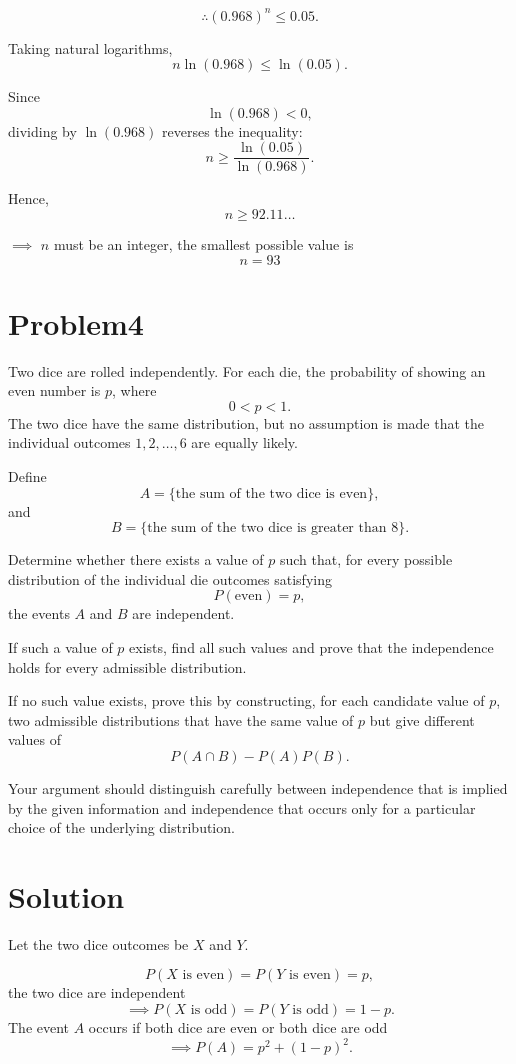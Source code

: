 \documentclass[12pt]{article}
\begin{document}
\[
\therefore
(0.968)^n\leq 0.05.
\]

Taking natural logarithms,
\[
n\ln(0.968)\leq \ln(0.05).
\]

Since
\[
\ln(0.968)<0,
\]
dividing by $\ln(0.968)$ reverses the inequality:
\[
n\geq
\frac{\ln(0.05)}{\ln(0.968)}.
\]

Hence,
\[
n\geq 92.11\ldots
\]

$\implies$ $n$ must be an integer, the smallest possible value is
\[
n=93
\]



\section*{Problem4}

Two dice are rolled independently. For each die, the probability of showing an even number is \(p\), where
\[
0<p<1.
\]
The two dice have the same distribution, but no assumption is made that the individual outcomes
\(1,2,\ldots,6\) are equally likely.

Define
\[
A=\{\text{the sum of the two dice is even}\},
\]
and
\[
B=\{\text{the sum of the two dice is greater than }8\}.
\]

Determine whether there exists a value of \(p\) such that, for every possible distribution of the individual die outcomes satisfying
\[
P(\text{even})=p,
\]
the events \(A\) and \(B\) are independent.

If such a value of \(p\) exists, find all such values and prove that the independence holds for every admissible distribution.

If no such value exists, prove this by constructing, for each candidate value of \(p\), two admissible distributions that have the same value of \(p\) but give different values of
\[
P(A\cap B)-P(A)P(B).
\]

Your argument should distinguish carefully between independence that is implied by the given information and independence that occurs only for a particular choice of the underlying distribution.

\section*{Solution}

Let the two dice outcomes be \(X\) and \(Y\).
 
\[
P(X\text{ is even})=P(Y\text{ is even})=p,
\]
the two dice are independent
\[
\implies
P(X\text{ is odd})=P(Y\text{ is odd})=1-p.
\]
The event \(A\) occurs if both dice are even or both dice are odd
\[
\implies
P(A)
=
p^2+(1-p)^2.
\]
\end{document}
